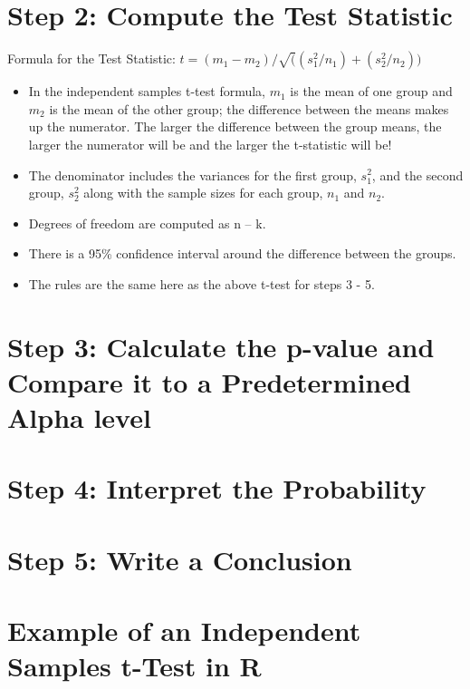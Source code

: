 \documentclass[
  letterpaper,
  DIV=11,
  numbers=noendperiod]{scrreprt}
\begin{document}
\section{Step 2: Compute the Test
Statistic}\label{step-2-compute-the-test-statistic}

Formula for the Test Statistic:
\(t = (m_1 - m_2)/\sqrt((s^2_1/n_1)+(s^2_2/n_2))\)

\begin{itemize}
\item
  In the independent samples t-test formula, \(m_1\) is the mean of one
  group and \(m_2\) is the mean of the other group; the difference
  between the means makes up the numerator. The larger the difference
  between the group means, the larger the numerator will be and the
  larger the t-statistic will be!
\item
  The denominator includes the variances for the first group, \(s^2_1\),
  and the second group, \(s^2_2\) along with the sample sizes for each
  group, \(n_1\) and \(n_2\).
\item
  Degrees of freedom are computed as n -- k.
\item
  There is a 95\% confidence interval around the difference between the
  groups.
\item
  The rules are the same here as the above t-test for steps 3 - 5.
\end{itemize}

\section{Step 3: Calculate the p-value and Compare it to a Predetermined
Alpha
level}\label{step-3-calculate-the-p-value-and-compare-it-to-a-predetermined-alpha-level}

\section{Step 4: Interpret the
Probability}\label{step-4-interpret-the-probability}

\section{Step 5: Write a Conclusion}\label{step-5-write-a-conclusion}

\section{Example of an Independent Samples t-Test in
R}\label{example-of-an-independent-samples-t-test-in-r}
\end{document}

